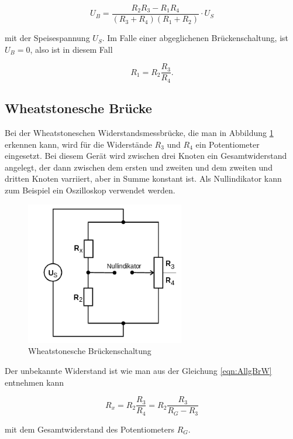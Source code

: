 \begin{equation}
  U_B = \frac{R_2R_3 - R_1R_4}{(R_3+R_4)(R_1+R_2)} \cdot U_S
  \label{eqn:Brs}
\end{equation}

mit der Speisespannung $U_S$.
Im Falle einer abgeglichenen Brückenschaltung, ist $U_B = 0$, also
ist in diesem Fall

\begin{equation}
  R_1 = R_2\frac{R_3}{R_4}.
  \label{eqn:AllgBrW}
\end{equation}


\subsection{Wheatstonesche Brücke}

Bei der Wheatstoneschen Widerstandsmessbrücke, die man in Abbildung
\ref{fig:WheBr} erkennen kann, wird für die
Widerstände $R_3$ und $R_4$ ein Potentiometer eingesetzt.
Bei diesem Gerät wird zwischen
drei Knoten ein Gesamtwiderstand angelegt, der dann zwischen dem ersten und
zweiten und dem zweiten und dritten Knoten varriiert, aber in Summe konstant
ist. Als Nullindikator kann zum Beispiel ein Oszilloskop verwendet werden.

\begin{figure}[h]
  \centering
  \includegraphics[height=6.25cm]{WheBr.png}
  \caption{Wheatstonesche Brückenschaltung}
  \label{fig:WheBr}
\end{figure}

Der unbekannte Widerstand ist wie man aus der Gleichung
\eqref{eqn:AllgBrW} entnehmen kann

\begin{equation}
  R_x = R_2\frac{R_3}{R_4} = R_2\frac{R_3}{R_G - R_3}
\end{equation}

mit dem Gesamtwiderstand des Potentiometers $R_G$.


